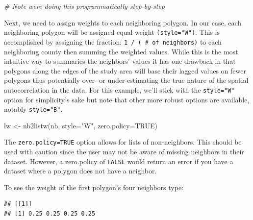 \documentclass[]{article}
\newenvironment{Shaded}{\begin{snugshade}}{\end{snugshade}}
\newcommand{\AttributeTok}[1]{\textcolor[rgb]{0.77,0.63,0.00}{#1}}
\newcommand{\CommentTok}[1]{\textcolor[rgb]{0.56,0.35,0.01}{\textit{#1}}}
\newcommand{\ConstantTok}[1]{\textcolor[rgb]{0.00,0.00,0.00}{#1}}
\newcommand{\DecValTok}[1]{\textcolor[rgb]{0.00,0.00,0.81}{#1}}
\newcommand{\FunctionTok}[1]{\textcolor[rgb]{0.00,0.00,0.00}{#1}}
\newcommand{\NormalTok}[1]{#1}
\newcommand{\OtherTok}[1]{\textcolor[rgb]{0.56,0.35,0.01}{#1}}
\newcommand{\SpecialCharTok}[1]{\textcolor[rgb]{0.00,0.00,0.00}{#1}}
\newcommand{\StringTok}[1]{\textcolor[rgb]{0.31,0.60,0.02}{#1}}
\begin{document}
\begin{Shaded}
\begin{Highlighting}[]
\CommentTok{\# Note we\textquotesingle{}re doing this programmatically step{-}by{-}step}
\end{Highlighting}
\end{Shaded}

Next, we need to assign weights to each neighboring polygon. In our
case, each neighboring polygon will be assigned equal weight
\texttt{(style="W")}. This is accomplished by assigning the fraction:
\texttt{1\ /\ (\ \#\ of\ neighbors)} to each neighboring county then
summing the weighted values. While this is the most intuitive way to
summaries the neighbors' values it has one drawback in that polygons
along the edges of the study area will base their lagged values on fewer
polygons thus potentially over- or under-estimating the true nature of
the spatial autocorrelation in the data. For this example, we'll stick
with the \texttt{style="W"} option for simplicity's sake but note that
other more robust options are available, notably \texttt{style="B"}.

\begin{Shaded}
\begin{Highlighting}[]
\NormalTok{lw }\OtherTok{\textless{}{-}} \FunctionTok{nb2listw}\NormalTok{(nb, }\AttributeTok{style=}\StringTok{"W"}\NormalTok{, }\AttributeTok{zero.policy=}\ConstantTok{TRUE}\NormalTok{)}
\end{Highlighting}
\end{Shaded}

The \texttt{zero.policy=TRUE} option allows for lists of non-neighbors.
This should be used with caution since the user may not be aware of
missing neighbors in their dataset. However, a zero.policy of
\texttt{FALSE} would return an error if you have a dataset where a
polygon does not have a neighbor.

To see the weight of the first polygon's four neighbors type:

\begin{Shaded}
\end{Shaded}

\begin{verbatim}
## [[1]]
## [1] 0.25 0.25 0.25 0.25
\end{verbatim}
\end{document}
